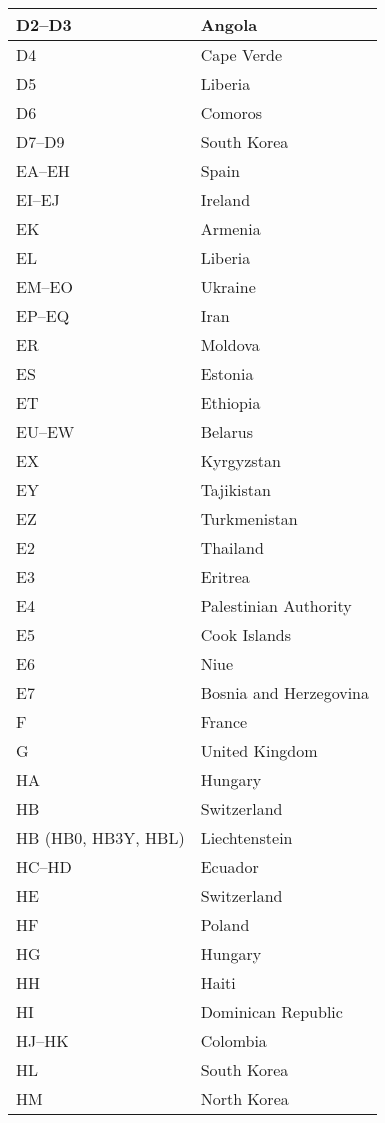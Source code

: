 \begin{longtable}{|l|l|}
	\hline
	D2--D3 & Angola \\
	\hline
	D4 & Cape Verde \\
	\hline
	D5 & Liberia \\
	\hline
	D6 & Comoros \\
	\hline
	D7--D9 & South Korea \\
	\hline
	EA--EH & Spain \\
	\hline
	EI--EJ & Ireland \\
	\hline
	EK & Armenia \\
	\hline
	EL & Liberia \\
	\hline
	EM--EO & Ukraine \\
	\hline
	EP--EQ & Iran \\
	\hline
	ER & Moldova \\
	\hline
	ES & Estonia \\
	\hline
	ET & Ethiopia \\
	\hline
	EU--EW & Belarus \\
	\hline
	EX & Kyrgyzstan \\
	\hline
	EY & Tajikistan \\
	\hline
	EZ & Turkmenistan \\
	\hline
	E2 & Thailand \\
	\hline
	E3 & Eritrea \\
	\hline
	E4 & Palestinian Authority \\
	\hline
	E5 & Cook Islands \\
	\hline
	E6 & Niue \\
	\hline
	E7 & Bosnia and Herzegovina \\
	\hline
	F & France \\
	\hline
	G & United Kingdom \\
	\hline
	HA & Hungary \\
	\hline
	HB & Switzerland \\
	\hline
	HB (HB0, HB3Y, HBL) & Liechtenstein \\
	\hline
	HC--HD & Ecuador \\
	\hline
	HE & Switzerland \\
	\hline
	HF & Poland \\
	\hline
	HG & Hungary \\
	\hline
	HH & Haiti \\
	\hline
	HI & Dominican Republic \\
	\hline
	HJ--HK & Colombia \\
	\hline
	HL & South Korea \\
	\hline
	HM & North Korea \\

\end{longtable}
